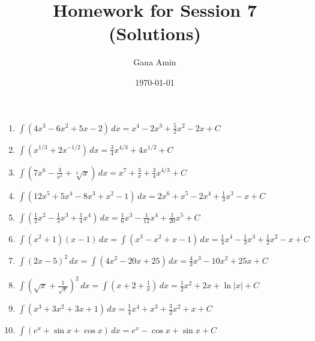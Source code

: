 \documentclass{article}
\begin{document}
\title{Homework for Session 7 (Solutions)}
\author{Gana Amin}
\date{\today}
\maketitle

\begin{enumerate}
\item $\int (4x^3 - 6x^2 + 5x - 2) \, dx = x^4 - 2x^3 + \frac{5}{2}x^2 -2x + C$ 
\item $\int (x^{1/3} + 2x^{-1/2}) \, dx = \frac{3}{4}x^{4/3} + 4x^{1/2} + C$
\item $\int (7x^6 - \frac{3}{x^2} + \sqrt[3]{x}) \, dx = x^7 + \frac{3}{x} + \frac{3}{4}x^{4/3} + C$
\item $\int (12x^5 + 5x^4 - 8x^3 + x^2 - 1) \, dx = 2x^6 + x^5 - 2x^4 + \frac{1}{3}x^3 - x + C$
\item $\int (\frac{1}{2}x^2 - \frac{1}{3}x^3 + \frac{1}{4}x^4) \, dx = \frac{1}{6}x^3 - \frac{1}{12}x^4 + \frac{1}{20}x^5 + C$
\item $\int (x^2 + 1)(x - 1) \, dx = \int (x^3 - x^2 + x - 1) \, dx = \frac{1}{4}x^4 - \frac{1}{3}x^3 + \frac{1}{2}x^2 - x + C$
\item $\int (2x - 5)^2 \, dx = \int (4x^2 - 20x + 25) \, dx = \frac{4}{3}x^3 - 10x^2 + 25x + C$
\item $\int (\sqrt{x} + \frac{1}{\sqrt{x}})^2 \, dx = \int (x + 2 + \frac{1}{x}) \, dx = \frac{1}{2}x^2 + 2x + \ln|x| + C$
\item $\int (x^3 + 3x^2 + 3x + 1) \, dx = \frac{1}{4}x^4 + x^3 + \frac{3}{2}x^2 + x + C$
\item $\int (e^x + \sin x + \cos x) \, dx = e^x - \cos x + \sin x + C$ 
\end{enumerate}
\end{document}
